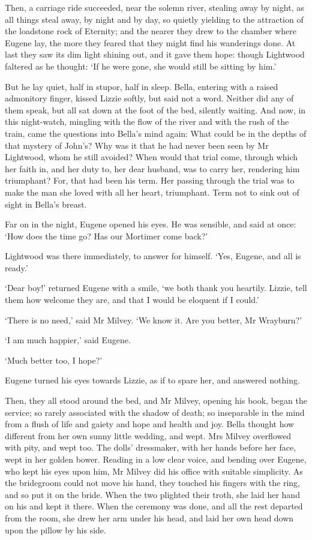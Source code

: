 Then, a carriage ride succeeded, near the solemn river, stealing away
by night, as all things steal away, by night and by day, so quietly
yielding to the attraction of the loadstone rock of Eternity; and the
nearer they drew to the chamber where Eugene lay, the more they feared
that they might find his wanderings done. At last they saw its dim light
shining out, and it gave them hope: though Lightwood faltered as he
thought: ‘If he were gone, she would still be sitting by him.’

But he lay quiet, half in stupor, half in sleep. Bella, entering with
a raised admonitory finger, kissed Lizzie softly, but said not a word.
Neither did any of them speak, but all sat down at the foot of the bed,
silently waiting. And now, in this night-watch, mingling with the flow
of the river and with the rush of the train, came the questions into
Bella’s mind again: What could be in the depths of that mystery of
John’s? Why was it that he had never been seen by Mr Lightwood, whom he
still avoided? When would that trial come, through which her faith
in, and her duty to, her dear husband, was to carry her, rendering him
triumphant? For, that had been his term. Her passing through the trial
was to make the man she loved with all her heart, triumphant. Term not
to sink out of sight in Bella’s breast.

Far on in the night, Eugene opened his eyes. He was sensible, and said
at once: ‘How does the time go? Has our Mortimer come back?’

Lightwood was there immediately, to answer for himself. ‘Yes, Eugene,
and all is ready.’

‘Dear boy!’ returned Eugene with a smile, ‘we both thank you heartily.
Lizzie, tell them how welcome they are, and that I would be eloquent if
I could.’

‘There is no need,’ said Mr Milvey. ‘We know it. Are you better, Mr
Wrayburn?’

‘I am much happier,’ said Eugene.

‘Much better too, I hope?’

Eugene turned his eyes towards Lizzie, as if to spare her, and answered
nothing.

Then, they all stood around the bed, and Mr Milvey, opening his book,
began the service; so rarely associated with the shadow of death; so
inseparable in the mind from a flush of life and gaiety and hope and
health and joy. Bella thought how different from her own sunny little
wedding, and wept. Mrs Milvey overflowed with pity, and wept too. The
dolls’ dressmaker, with her hands before her face, wept in her golden
bower. Reading in a low clear voice, and bending over Eugene, who kept
his eyes upon him, Mr Milvey did his office with suitable simplicity.
As the bridegroom could not move his hand, they touched his fingers with
the ring, and so put it on the bride. When the two plighted their troth,
she laid her hand on his and kept it there. When the ceremony was done,
and all the rest departed from the room, she drew her arm under his
head, and laid her own head down upon the pillow by his side.

